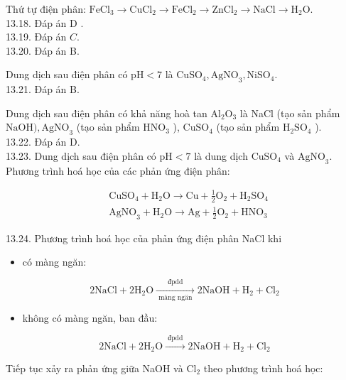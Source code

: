 \documentclass[10pt]{article}
\begin{document}
Thứ tự điện phân: $\mathrm{FeCl}_{3} \rightarrow \mathrm{CuCl}_{2} \rightarrow \mathrm{FeCl}_{2} \rightarrow \mathrm{ZnCl}_{2} \rightarrow \mathrm{NaCl} \rightarrow \mathrm{H}_{2} \mathrm{O}$.\\
13.18. Đáp án D .\\
13.19. Đáp án $C$.\\
13.20. Đáp án B.

Dung dịch sau điện phân có $\mathrm{pH}<7$ là $\mathrm{CuSO}_{4}, \mathrm{AgNO}_{3}, \mathrm{NiSO}_{4}$.\\
13.21. Đáp án B.

Dung dịch sau điện phân có khả năng hoà tan $\mathrm{Al}_{2} \mathrm{O}_{3}$ là NaCl (tạo sản phẩm $\mathrm{NaOH}), \mathrm{AgNO}_{3}$ (tạo sản phẩm $\mathrm{HNO}_{3}$ ), $\mathrm{CuSO}_{4}$ (tạo sản phẩm $\mathrm{H}_{2} \mathrm{SO}_{4}$ ).\\
13.22. Đáp án D.\\
13.23. Dung dịch sau điện phân có $\mathrm{pH}<7$ là dung dịch $\mathrm{CuSO}_{4}$ và $\mathrm{AgNO}_{3}$. Phương trình hoá học của các phản ứng điện phân:

$$
\begin{aligned}
& \mathrm{CuSO}_{4}+\mathrm{H}_{2} \mathrm{O} \rightarrow \mathrm{Cu}+\frac{1}{2} \mathrm{O}_{2}+\mathrm{H}_{2} \mathrm{SO}_{4} \\
& \mathrm{AgNO}_{3}+\mathrm{H}_{2} \mathrm{O} \rightarrow \mathrm{Ag}+\frac{1}{2} \mathrm{O}_{2}+\mathrm{HNO}_{3}
\end{aligned}
$$

13.24. Phương trình hoá học của phản ứng điện phân NaCl khi

\begin{itemize}
  \item có màng ngăn:
\end{itemize}

$$
2 \mathrm{NaCl}+2 \mathrm{H}_{2} \mathrm{O} \xrightarrow[\text { màng ngän }]{\text { đpdd }} 2 \mathrm{NaOH}+\mathrm{H}_{2}+\mathrm{Cl}_{2}
$$

\begin{itemize}
  \item không có màng ngăn, ban đầu:
\end{itemize}

$$
2 \mathrm{NaCl}+2 \mathrm{H}_{2} \mathrm{O} \xrightarrow{\text { đpdd }} 2 \mathrm{NaOH}+\mathrm{H}_{2}+\mathrm{Cl}_{2}
$$

Tiếp tục xảy ra phản ứng giữa NaOH và $\mathrm{Cl}_{2}$ theo phương trình hoá học:
\end{document}
